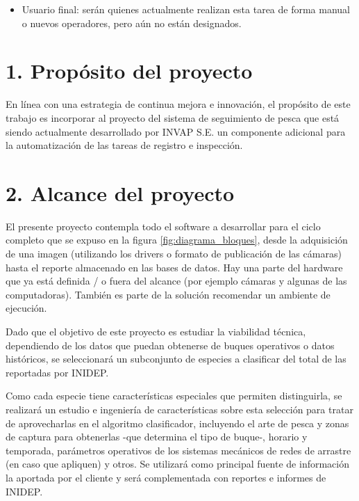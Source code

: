 \documentclass[11pt]{charter}
\begin{document}
\begin{itemize}
\item Usuario final: serán quienes actualmente realizan esta tarea de forma manual o nuevos operadores, pero aún no están designados.
\end{itemize}

\section{1. Propósito del proyecto}
\label{sec:proposito}

En línea con una estrategia de continua mejora e innovación, el propósito de este trabajo es incorporar al proyecto del sistema de seguimiento de pesca que está siendo actualmente desarrollado por INVAP S.E. un componente adicional para la automatización de las tareas de registro e inspección. 

\section{2. Alcance del proyecto}
\label{sec:alcance}

El presente proyecto contempla todo el software a desarrollar para el ciclo completo que se expuso en la figura \ref{fig:diagrama_bloques}, desde la adquisición de una imagen (utilizando los drivers o formato de publicación de las cámaras) hasta el reporte almacenado en las bases de datos. Hay una parte del hardware que ya está definida / o fuera del alcance (por ejemplo cámaras y algunas de las computadoras). También es parte de la solución recomendar un ambiente de ejecución.

Dado que el objetivo de este proyecto es estudiar la viabilidad técnica, dependiendo de los datos que puedan obtenerse de buques operativos o datos históricos, se seleccionará un subconjunto de especies a clasificar del total de las reportadas por INIDEP. 

Como cada especie tiene características especiales que permiten distinguirla, se realizará un estudio e ingeniería de características sobre esta selección para tratar de aprovecharlas en el algoritmo clasificador, incluyendo el arte de pesca y zonas de captura para obtenerlas -que determina el tipo de buque-, horario y temporada, parámetros operativos de los sistemas mecánicos de redes de arrastre (en caso que apliquen) y otros. Se utilizará como principal fuente de información la aportada por el cliente y será complementada con reportes e informes de INIDEP. 
\end{document}
